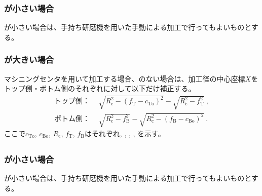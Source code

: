 \subsubsection{\EndFaceCChamferLength が小さい場合}
\EndFaceOutCChamferLength が小さい場合は、手持ち研磨機を用いた手動による加工で行ってもよいものとする。

\subsubsection{\EndFaceCChamferLength が大きい場合}
マシニングセンタを用いて加工する場合、\Outcut のない場合は、加工径の中心座標$X$をトップ側・ボトム側のそれぞれに対して以下だけ補正する。
\begin{align*}
  \text{トップ側：}&~~
  \sqrt{R_\mathrm c^2-\left(f_\mathrm T-c_\mathrm{To}\right)^2}-\sqrt{R_\mathrm c^2-f_\mathrm T^2}\ ,\\
  \text{ボトム側：}&~~
  \sqrt{R_\mathrm c^2-f_\mathrm B^2}-\sqrt{R_\mathrm c^2-\left(f_\mathrm B-c_\mathrm{Bo}\right)^2}\ .
\end{align*}
ここで$c_\mathrm{To}$, $c_\mathrm{Bo}$, $R_\mathrm c$, $f_\mathrm T$, $f_\mathrm B$はそれぞれ\TopEndFaceOutCChamferLength, \BottomEndFaceOutCChamferLength, \CenterCurvatureRadius, \TopAlocationLength, \BottomAlocationLength を示す。


\clearpage
\subsection{\EndFaceInCChamferMilling}

\subsubsection{\EndFaceInCChamferLength が小さい場合}
\EndFaceInCChamferLength が小さい場合は、手持ち研磨機を用いた手動による加工で行ってもよいものとする。

